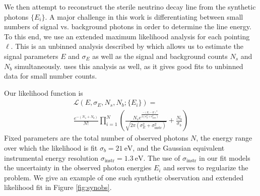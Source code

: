 \documentclass[aps,prd,10pt,twocolumn,superscriptaddress,showpacs]{revtex4-1}
\newcommand{\units}[1]{~\mathrm{#1}}
\begin{document}
We then attempt to reconstruct the sterile neutrino decay line from the synthetic photons $\{E_i\}$.
A major challenge in this work is differentiating between small numbers of signal vs. background photons in
order to determine the line energy. To this end, we use an extended maximum likelihood analysis for
each pointing $\ell$.  This is an unbinned analysis described by \cite{barlow1990} which allows us to estimate
the signal parameters $E$ and $\sigma_E$ as well as the signal and background counts $N_s$
and $N_b$ simultaneously. \cite{Figueroa-Feliciano:2015gwa} uses this analysis as well, as it gives
good fits to unbinned data for small number counts. 

Our likelihood function is
\begin{multline}
	\mathcal{L}(E, \sigma_E, N_s, N_b; \{E_i\}) =\\
	\frac{e^{-(N_s+N_b)}}{N!} \prod_{i=1}^{N}
	\left(\frac{N_s e^{\frac{-(E_i-E)^2}{2(\sigma_E^2+\sigma_\mathrm{instr}^2)}}}
	{\sqrt{2\pi(\sigma_E^2+\sigma_\mathrm{instr}^2)}}+\frac{N_b}{\sigma_b}\right)
\end{multline}
Fixed parameters are the total number
of observed photons $N$, the energy range over which the likelihood is fit $\sigma_b=21 \units{eV}$, 
and the Gaussian equivalent instrumental energy resolution $\sigma_\mathrm{instr}=1.3 \units{eV}$. The use of $\sigma_\mathrm{instr}$
in our fit models the uncertainty in the observed photon energies $E_i$ and serves to regularize the problem.
We give an example of one such synthetic observation and extended likelihood fit in Figure
\ref{fig:synobs}.


\end{document}
